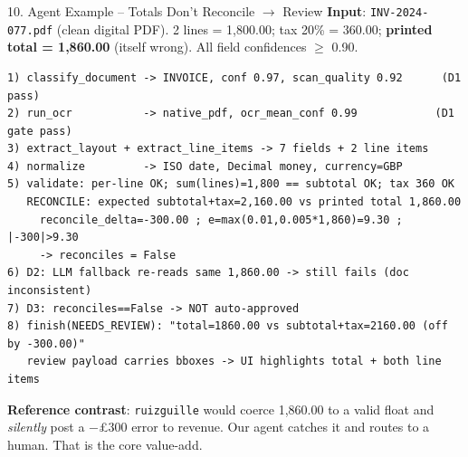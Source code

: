 \documentclass[10pt,aspectratio=169]{beamer}
\begin{document}
\begin{frame}[fragile]{10. Agent Example -- Totals Don't Reconcile $\to$ Review}
\textbf{Input}: \texttt{INV-2024-077.pdf} (clean digital PDF). 2 lines = 1,800.00; tax 20\% = 360.00; \textbf{printed total = 1,860.00} (itself wrong). All field confidences $\geq$ 0.90.
\begin{lstlisting}[basicstyle=\ttfamily\tiny]
1) classify_document -> INVOICE, conf 0.97, scan_quality 0.92      (D1 pass)
2) run_ocr           -> native_pdf, ocr_mean_conf 0.99            (D1 gate pass)
3) extract_layout + extract_line_items -> 7 fields + 2 line items
4) normalize         -> ISO date, Decimal money, currency=GBP
5) validate: per-line OK; sum(lines)=1,800 == subtotal OK; tax 360 OK
   RECONCILE: expected subtotal+tax=2,160.00 vs printed total 1,860.00
     reconcile_delta=-300.00 ; e=max(0.01,0.005*1,860)=9.30 ; |-300|>9.30
     -> reconciles = False
6) D2: LLM fallback re-reads same 1,860.00 -> still fails (doc inconsistent)
7) D3: reconciles==False -> NOT auto-approved
8) finish(NEEDS_REVIEW): "total=1860.00 vs subtotal+tax=2160.00 (off by -300.00)"
   review payload carries bboxes -> UI highlights total + both line items
\end{lstlisting}
\scriptsize \textbf{Reference contrast}: \texttt{ruizguille} would coerce 1,860.00 to a valid float and \emph{silently} post a $-$\pounds300 error to revenue. Our agent catches it and routes to a human. That is the core value-add.
\end{frame}
\end{document}
